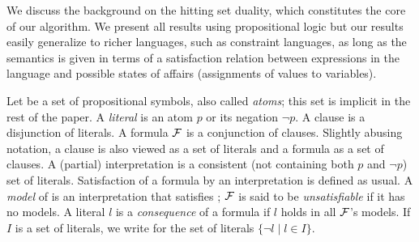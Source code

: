 We discuss the background on the hitting set duality, which constitutes the core of our algorithm. 
We present all results using propositional logic but our results easily generalize to richer languages, such as constraint languages, as long as the semantics is given in terms of a satisfaction relation  between expressions in the language and possible states of affairs (assignments of values to variables).
 
%  
% 
% 

Let \voc be a set of propositional symbols, also called \emph{atoms}; this set is implicit in the rest of the paper. A \emph{literal} is an atom $p$ or its negation $\lnot p$. 
A clause is a disjunction of literals. A formula $\mathcal{F} $ is a conjunction of clauses. 
Slightly abusing notation, a clause is also viewed as a set of literals and a formula as a set of clauses.
A (partial) interpretation is a consistent (not containing both $p$ and $\lnot p$) set of literals. 
Satisfaction of a formula \formula by an interpretation is defined as usual. 
A \emph{model} of \formula is an interpretation that satisfies \formula; 
$\mathcal{F} $ is said to be \emph{unsatisfiable} if it has no models.
A literal $l$ is a \emph{consequence} of a formula \formula if $l$ holds in all $\mathcal{F} $'s models. %
If $I$ is a set of literals, we write  for the set of literals $\{\lnot l\mid l\in I\}$.

